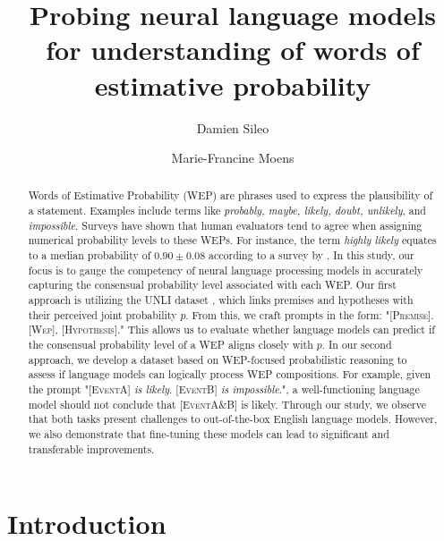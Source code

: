\documentclass[11pt]{article}
\title{Probing neural language models\\ for understanding of words of estimative probability }
\author[1]{Damien Sileo}
\author[2]{Marie-Francine Moens}
\affil[1]{Univ. Lille, Inria, CNRS, Centrale Lille, UMR 9189 - CRIStAL, F-59000 Lille, France}
\affil[2]{Department of Computer Science, KU Leuven, Belgium} \vspace{-2ex}
\affil[ ]{\url{damien.sileo@inria.fr}}
\begin{document}
\maketitle
\begin{abstract}


Words of Estimative Probability (WEP) are phrases used to express the plausibility of a statement. Examples include terms like \textit{probably, maybe, likely, doubt, unlikely}, and \textit{impossible}. Surveys have shown that human evaluators tend to agree when assigning numerical probability levels to these WEPs. For instance, the term \textit{highly likely} equates to a median probability of $0.90{\pm}0.08$ according to a survey by \citet{fagen-ulmschneider}.
In this study, our focus is to gauge the competency of neural language processing models in accurately capturing the consensual probability level associated with each WEP. Our first approach is utilizing the UNLI dataset \cite{chen-etal-2020-uncertain}, which links premises and hypotheses with their perceived joint probability $p$. From this, we craft prompts in the form: "[\textsc{Premise}]. [\textsc{Wep}], [\textsc{Hypothesis}]." This allows us to evaluate whether language models can predict if the consensual probability level of a WEP aligns closely with $p$.
In our second approach, we develop a dataset based on WEP-focused probabilistic reasoning to assess if language models can logically process WEP compositions. For example, given the prompt "[\textsc{EventA}] \textit{is likely}. [\textsc{EventB}] \textit{is impossible}.", a well-functioning language model should not conclude that [\textsc{EventA$\&$B}] is likely.
Through our study, we observe that both tasks present challenges to out-of-the-box English language models. However, we also demonstrate that fine-tuning these models can lead to significant and transferable improvements.



\end{abstract}

\section{Introduction}
\end{document}
